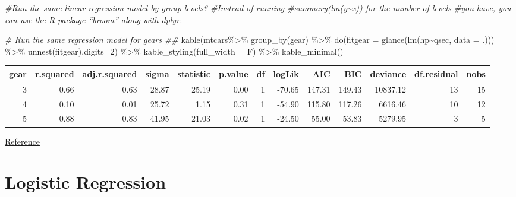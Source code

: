 \documentclass[
]{book}
\newenvironment{Shaded}{\begin{snugshade}}{\end{snugshade}}
\newcommand{\AttributeTok}[1]{\textcolor[rgb]{0.77,0.63,0.00}{#1}}
\newcommand{\CommentTok}[1]{\textcolor[rgb]{0.56,0.35,0.01}{\textit{#1}}}
\newcommand{\DecValTok}[1]{\textcolor[rgb]{0.00,0.00,0.81}{#1}}
\newcommand{\FunctionTok}[1]{\textcolor[rgb]{0.00,0.00,0.00}{#1}}
\newcommand{\NormalTok}[1]{#1}
\newcommand{\SpecialCharTok}[1]{\textcolor[rgb]{0.00,0.00,0.00}{#1}}
\begin{document}
\begin{Shaded}
\begin{Highlighting}[]
\CommentTok{\#Run the same linear regression model by group levels? }
\CommentTok{\#Instead of running \#summary(lm(y\textasciitilde{}x)) for the number of levels }
\CommentTok{\#you have, you can use the R package “broom” along with dplyr.}

\CommentTok{\# Run the same regression model for gears \#\#}
\FunctionTok{kable}\NormalTok{(mtcars}\SpecialCharTok{\%\textgreater{}\%} \FunctionTok{group\_by}\NormalTok{(gear) }\SpecialCharTok{\%\textgreater{}\%}
  \FunctionTok{do}\NormalTok{(}\AttributeTok{fitgear =} \FunctionTok{glance}\NormalTok{(}\FunctionTok{lm}\NormalTok{(hp}\SpecialCharTok{\textasciitilde{}}\NormalTok{qsec, }\AttributeTok{data =}\NormalTok{ .))) }\SpecialCharTok{\%\textgreater{}\%} 
  \FunctionTok{unnest}\NormalTok{(fitgear),}\AttributeTok{digits=}\DecValTok{2}\NormalTok{) }\SpecialCharTok{\%\textgreater{}\%}   \FunctionTok{kable\_styling}\NormalTok{(}\AttributeTok{full\_width =}\NormalTok{ F) }\SpecialCharTok{\%\textgreater{}\%} 
  \FunctionTok{kable\_minimal}\NormalTok{()}
\end{Highlighting}
\end{Shaded}

\begin{table}
\centering
\begin{tabular}{r|r|r|r|r|r|r|r|r|r|r|r|r}
\hline
gear & r.squared & adj.r.squared & sigma & statistic & p.value & df & logLik & AIC & BIC & deviance & df.residual & nobs\\
\hline
3 & 0.66 & 0.63 & 28.87 & 25.19 & 0.00 & 1 & -70.65 & 147.31 & 149.43 & 10837.12 & 13 & 15\\
\hline
4 & 0.10 & 0.01 & 25.72 & 1.15 & 0.31 & 1 & -54.90 & 115.80 & 117.26 & 6616.46 & 10 & 12\\
\hline
5 & 0.88 & 0.83 & 41.95 & 21.03 & 0.02 & 1 & -24.50 & 55.00 & 53.83 & 5279.95 & 3 & 5\\
\hline
\end{tabular}
\end{table}

\href{https://stackoverflow.com/questions/22713325/fitting-several-regression-models-with-dplyr}{Reference}

\hypertarget{logistic-regression}{%
\section{Logistic Regression}\label{logistic-regression}}
\end{document}
